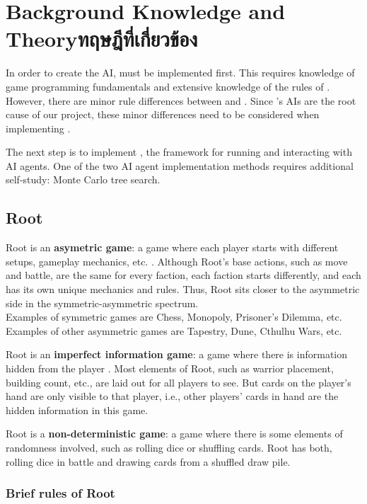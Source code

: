 \chapter{\ifenglish Background Knowledge and Theory\else ทฤษฎีที่เกี่ยวข้อง\fi}

In order to create the AI, \RootOurs{} must be implemented first. This requires knowledge of game programming fundamentals and extensive knowledge of the rules of \RootB{}. However, there are minor rule differences between \RootV{} and \RootB{}. Since \RootV{}'s AIs are the root cause of our project, these minor differences need to be considered when implementing \RootOurs{}.

The next step is to implement \RootAI{}, the framework for running \RootOurs{} and interacting with AI agents. One of the two AI agent implementation methods requires additional self-study: Monte Carlo tree search.

\section{Root}
Root is an \textbf{asymetric game}: a game where each player starts with different setups, gameplay mechanics, etc. \cite{Mike_Shor-2023-10-06}. Although Root's base actions, such as move and battle, are the same for every faction, each faction starts differently, and each has its own unique mechanics and rules. Thus, Root sits closer to the asymmetric side in the symmetric-asymmetric spectrum. \\
Examples of symmetric games are Chess, Monopoly, Prisoner's Dilemma, etc.\\
Examples of other asymmetric games are Tapestry, Dune, Cthulhu Wars, etc.

Root is an \textbf{imperfect information game}: a game where there is information hidden from the player \cite{osborne1994course}. Most elements of Root, such as warrior placement, building count, etc., are laid out for all players to see. But cards on the player's hand are only visible to that player, i.e., other players' cards in hand are the hidden information in this game.

Root is a \textbf{non-deterministic game}: a game where there is some elements of randomness involved, such as rolling dice or shuffling cards. Root has both, rolling dice in battle and drawing cards from a shuffled draw pile.

\subsection{Brief rules of Root} \label{brief-rules-of-root}

